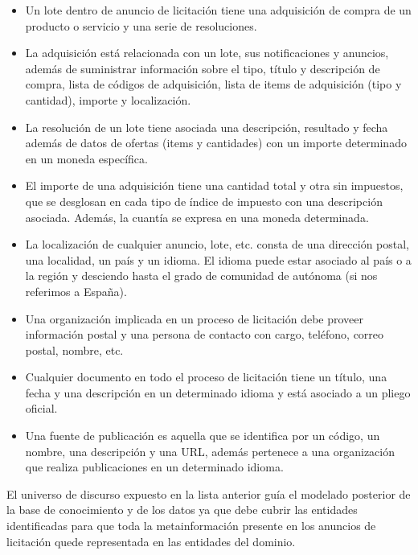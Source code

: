 \begin{itemize}
\item Un lote dentro de anuncio de licitación tiene una adquisición de compra de un producto o servicio y una serie 
de resoluciones.
\item La adquisición está relacionada con un lote, sus notificaciones y anuncios, además de suministrar información 
sobre el tipo, título y descripción de compra, lista de códigos de adquisición, lista de items de adquisición (tipo y cantidad),
importe y localización.
\item La resolución de un lote tiene asociada una descripción, resultado y fecha además de datos de ofertas (items y cantidades) con 
un importe determinado en un moneda específica.
\item El importe de una adquisición tiene una cantidad total y otra sin impuestos, que se desglosan en cada tipo 
de índice de impuesto con una descripción asociada. Además, la cuantía se expresa en una moneda determinada.
\item La localización de cualquier anuncio, lote, etc. consta de una dirección postal, una localidad, un país y un idioma. El idioma 
puede estar asociado al país o a la región y desciendo hasta el grado de comunidad de autónoma (si nos referimos a España).
\item Una organización implicada en un proceso de licitación debe proveer información postal y una persona de contacto con 
cargo, teléfono, correo postal, nombre, etc.
\item Cualquier documento en todo el proceso de licitación tiene un título, una fecha y una descripción en un determinado 
idioma y está asociado a un pliego oficial.
\item Una fuente de publicación es aquella que se identifica por un código, un nombre, una descripción y una URL, además 
pertenece a una organización que realiza publicaciones en un determinado idioma.
\end{itemize}

El universo de discurso expuesto en la lista anterior guía el modelado posterior de la base de conocimiento 
y de los datos ya que debe cubrir las entidades identificadas para que toda la metainformación presente 
en los anuncios de licitación quede representada en las entidades del dominio. 

